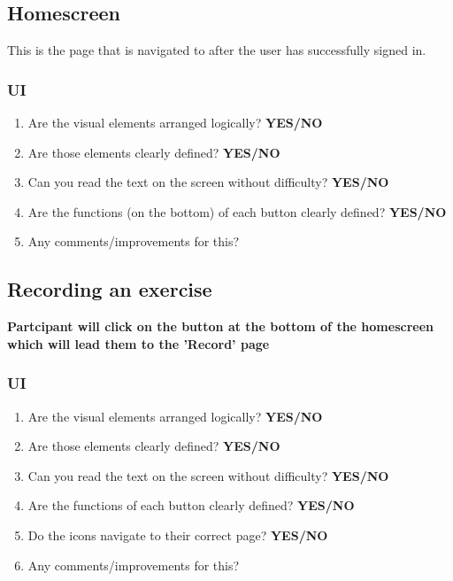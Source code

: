 \documentclass[12pt, titlepage]{article}
\begin{document}
\subsection{Homescreen}
This is the page that is navigated to after the user has successfully signed in. 
\subsubsection{UI}
\begin{enumerate}
    \item Are the visual elements arranged logically? \textbf{YES/NO}
    \item Are those elements clearly defined? \textbf{YES/NO}
    \item Can you read the text on the screen without difficulty? \textbf{YES/NO}
    \item Are the functions (on the bottom) of each button clearly defined? \textbf{YES/NO}
    \item Any comments/improvements for this?
\end{enumerate}

\subsection{Recording an exercise}
\textbf{Partcipant will click on the button at the bottom of the homescreen which will lead them to the 'Record' page}
\subsubsection{UI}
\begin{enumerate}
    \item Are the visual elements arranged logically? \textbf{YES/NO}
    \item Are those elements clearly defined? \textbf{YES/NO}
    \item Can you read the text on the screen without difficulty? \textbf{YES/NO}
    \item Are the functions of each button clearly defined? \textbf{YES/NO}
    \item Do the icons navigate to their correct page? \textbf{YES/NO}
    \item Any comments/improvements for this?
\end{enumerate} 
\end{document}
